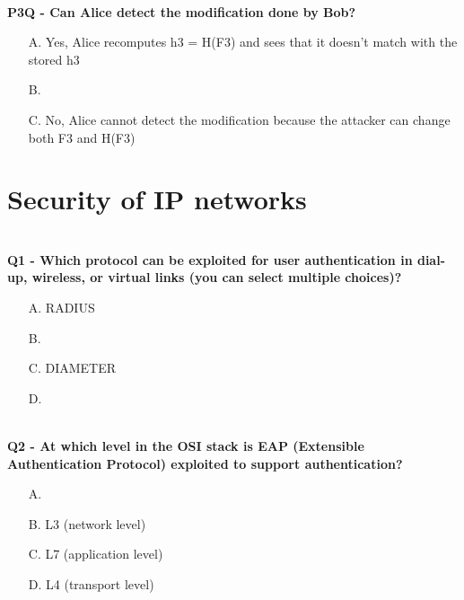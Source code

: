\textbf{\\P3Q - Can Alice detect the modification done by Bob?}
\begin{itemize}
	\item[A.] Yes, Alice recomputes h3 = H(F3) and sees that it doesn't match with the stored h3
	\item[B.] 
	\item[C.] No, Alice cannot detect the modification because the attacker can change both F3 and H(F3)
\end{itemize}

\section{Security of IP networks}
\textbf{\\Q1 - Which protocol can be exploited for user authentication in dial-up, wireless, or virtual links (you can select multiple choices)?}
\begin{itemize}
	\item[A.] RADIUS
	\item[B.] 
	\item[C.] DIAMETER
	\item[D.] 
\end{itemize}

\textbf{\\Q2 - At which level in the OSI stack is EAP (Extensible Authentication Protocol) exploited to support authentication?}
\begin{itemize}
	\item[A.] 
	\item[B.] L3 (network level)
	\item[C.] L7 (application level)
	\item[D.] L4 (transport level)
\end{itemize}

